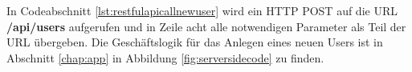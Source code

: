 	In Codeabschnitt \ref{lst:restfulapicallnewuser} wird ein HTTP POST auf die URL \textbf{/api/users} aufgerufen und in Zeile acht alle notwendigen Parameter als Teil der URL übergeben. Die Geschäftslogik für das Anlegen eines neuen Users ist in Abschnitt \ref{chap:app} in Abbildung \ref{fig:serversidecode} zu finden.













